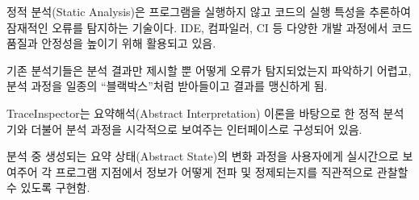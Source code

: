 \documentclass[%
    colorscheme=blue,   %
    fontsize=36pt,        %
    papersize=a0paper,    %
    paper=930mm:1000mm,
    orientation=portrait, %
    debug=false           %
]{betterposterv2}
\title{}
\begin{document}
\maketitle
\newcommand{\inleq}[1]{\scalebox{1.7}{$#1$}}
\begin{bpbox}[bpcolor=grey, bpstyle=wide, title={배경}]
    정적 분석(Static Analysis)은 프로그램을 실행하지 않고 코드의 실행 특성을 추론하여 잠재적인 오류를 탐지하는 기술이다.
    IDE, 컴파일러, CI 등 다양한 개발 과정에서 코드 품질과 안정성을 높이기 위해 활용되고 있음.

    기존 분석기들은 분석 결과만 제시할 뿐 어떻게 오류가 탐지되었는지 파악하기 어렵고, 분석 과정을 일종의 “블랙박스”처럼 받아들이고 결과를 맹신하게 됨.
\end{bpbox}

\begin{bpbox}[title={TraceInspector 소개}]
    TraceInspector는 요약해석(Abstract Interpretation) 이론을 바탕으로 한 정적 분석기와 더불어 분석 과정을 시각적으로 보여주는 인터페이스로 구성되어 있음.

    분석 중 생성되는 요약 상태(Abstract State)의 변화 과정을 사용자에게 실시간으로 보여주어 각 프로그램 지점에서 정보가 어떻게 전파 및 정제되는지를 직관적으로 관찰할 수 있도록 구현함.
\end{bpbox}

\end{document}

